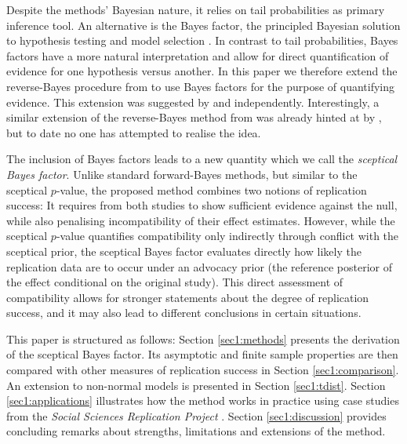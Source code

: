 Despite the methods' Bayesian nature, it relies on tail probabilities as primary
inference tool. An alternative is the Bayes factor, the principled Bayesian
solution to hypothesis testing and model selection \citep{Jeffreys1961,
Kass1995}. In contrast to tail probabilities, Bayes factors have a more natural
interpretation and allow for direct quantification of evidence for one
hypothesis versus another. In this paper we therefore extend the reverse-Bayes
procedure from \citet{Held2020} to use Bayes factors for the purpose of
quantifying evidence. This extension was suggested by \citet{Consonni2019} and
\citet{Pericchi2020} independently. Interestingly, a similar extension of the
reverse-Bayes method from \citet{Matthews2001b} was already hinted at by
\citet{Berger2001}, but to date no one has attempted to realise the idea.

The inclusion of Bayes factors leads to a new quantity which we call the
\emph{sceptical Bayes factor}. Unlike standard forward-Bayes methods, but
similar to the sceptical $p$-value, the proposed method combines two notions of
replication success: It requires from both studies to show sufficient evidence
against the null, while also penalising incompatibility of their effect
estimates. However, while the sceptical $p$-value quantifies compatibility only
indirectly through conflict with the sceptical prior, the sceptical Bayes factor
evaluates directly how likely the replication data are to occur under an
advocacy prior (the reference posterior of the effect conditional on the
original study). This direct assessment of compatibility allows for stronger
statements about the degree of replication success, and it may also lead to
different conclusions in certain situations.

This paper is structured as follows: Section \ref{sec1:methods} presents the
derivation of the sceptical Bayes factor. Its asymptotic and finite sample
properties are then compared with other measures of replication success in
Section \ref{sec1:comparison}. An extension to non-normal models is presented in
Section \ref{sec1:tdist}. Section \ref{sec1:applications} illustrates how the
method works in practice using case studies from the \emph{Social Sciences
  Replication Project} \citep{Camerer2018}. Section \ref{sec1:discussion}
provides concluding remarks about strengths, limitations and extensions of the
method.


